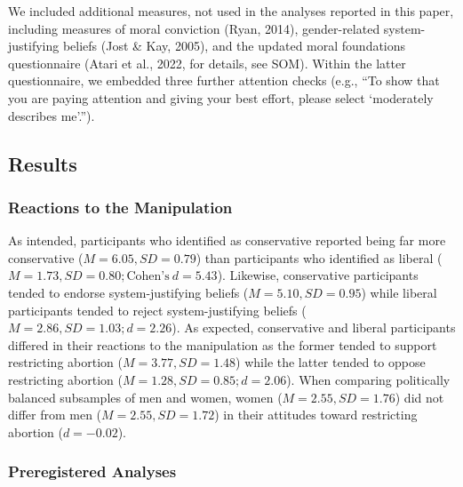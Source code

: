 \documentclass[12pt, letterpaper]{article}
\begin{document}
We included additional measures, not used in the analyses reported in
this paper, including measures of moral conviction (Ryan, 2014),
gender-related system-justifying beliefs (Jost \& Kay, 2005), and the
updated moral foundations questionnaire (Atari et al., 2022, for
details, see SOM). Within the latter questionnaire, we embedded three
further attention checks (e.g., ``To show that you are paying attention
and giving your best effort, please select `moderately describes
me'.'').

\hypertarget{results-2}{%
\subsection{Results}\label{results-2}}

\hypertarget{reactions-to-the-manipulation-2}{%
\subsubsection{Reactions to the
Manipulation}\label{reactions-to-the-manipulation-2}}

As intended, participants who identified as conservative reported being
far more conservative (\(M = 6.05, SD = 0.79\)) than participants who
identified as liberal
(\(M = 1.73, SD = 0.80; \text{Cohen's}~d = 5.43\)). Likewise,
conservative participants tended to endorse system-justifying beliefs
(\(M = 5.10, SD = 0.95\)) while liberal participants tended to reject
system-justifying beliefs (\(M = 2.86, SD = 1.03; d = 2.26\)). As
expected, conservative and liberal participants differed in their
reactions to the manipulation as the former tended to support
restricting abortion (\(M = 3.77, SD = 1.48\)) while the latter tended
to oppose restricting abortion (\(M = 1.28, SD = 0.85; d = 2.06\)). When
comparing politically balanced subsamples of men and women, women
(\(M = 2.55, SD = 1.76\)) did not differ from men
(\(M = 2.55, SD = 1.72\)) in their attitudes toward restricting abortion
(\(d = -0.02\)).

\hypertarget{preregistered-analyses-2}{%
\subsubsection{Preregistered Analyses}\label{preregistered-analyses-2}}
\end{document}
